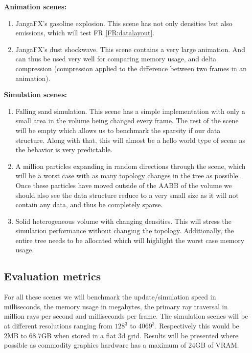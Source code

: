 \noindent\textbf{Animation scenes:}
\begin{enumerate}[noitemsep,topsep=0pt,parsep=0pt,partopsep=0pt]
    \item JangaFX's gasoline explosion. This scene has not only densities but also emissions, which will test FR \ref{FR:datalayout}.
    \item JangaFX's dust shockwave. This scene contains a very large animation. And can thus be used very well for comparing memory usage, and delta compression (compression applied to the difference between two frames in an animation).
\end{enumerate}

\noindent\textbf{Simulation scenes:}
\begin{enumerate}[noitemsep,topsep=0pt,parsep=0pt,partopsep=0pt]
    \item Falling sand simulation. This scene has a simple implementation with only a small area in the volume being changed every frame. The rest of the scene will be empty which allows us to benchmark the sparsity if our data structure. Along with that, this will almost be a hello world type of scene as the behavior is very predictable.
    \item A million particles expanding in random directions through the scene, which will be a worst case with as many topology changes in the tree as possible. Once these particles have moved outside of the AABB of the volume we should also see the data structure reduce to a very small size as it will not contain any data, and thus be completely sparse. 
    \item Solid heterogeneous volume with changing densities. This will stress the simulation performance without changing the topology. Additionally, the entire tree needs to be allocated which will highlight the worst case memory usage.
\end{enumerate}

\subsection{Evaluation metrics}\label{EVALUATION:metrics}
For all these scenes we will benchmark the update/simulation speed in milliseconds, the memory usage in megabytes, the primary ray traversal in million rays per second and milliseconds per frame. The simulation scenes will be at different resolutions ranging from $128^3$ to $4069^3$. Respectively this would be 2MB to 68.7GB when stored in a flat 3d grid. Results will be presented where possible as commodity graphics hardware has a maximum of 24GB of VRAM.
